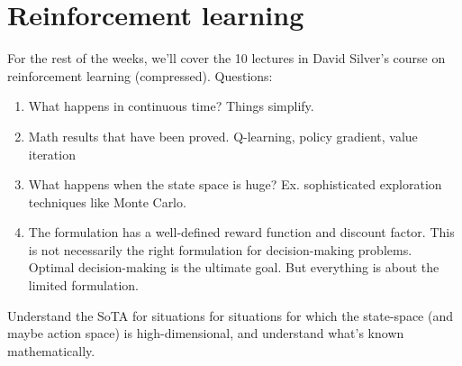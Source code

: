 \chapter{Reinforcement learning}

For the rest of the weeks, we'll cover the 10 lectures in David Silver's course on reinforcement learning (compressed). Questions:
\begin{enumerate}
\item
What happens in continuous time? Things simplify.
\item
Math results that have been proved. Q-learning, policy gradient, value iteration
\item What happens when the state space is huge? Ex. sophisticated exploration techniques like Monte Carlo.
\item
The formulation has a well-defined reward function and discount factor. This is not necessarily the right formulation for decision-making problems. Optimal decision-making is the ultimate goal. But everything is about the limited formulation.
%
\end{enumerate}
Understand the SoTA for situations for situations for which the state-space (and maybe action space) is high-dimensional, and understand what's known mathematically.




